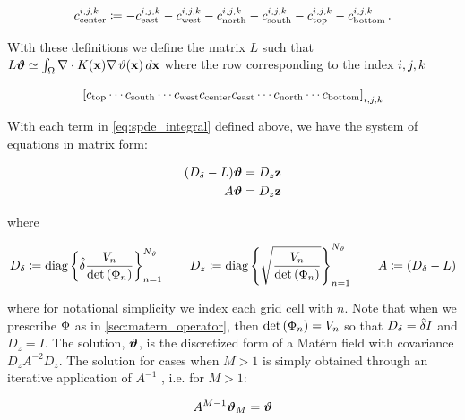 \begin{linenomath*}\begin{equation*}
    c_\text{center}^{i,j,k} \coloneqq
        - c_\text{east}^{i,j,k} - c_\text{west}^{i,j,k}
        - c_\text{north}^{i,j,k} - c_\text{south}^{i,j,k}
        - c_\text{top}^{i,j,k} - c_\text{bottom}^{i,j,k} \, .
\end{equation*}\end{linenomath*}
With these definitions we define the matrix $L$ such that
$L \bm{\vartheta} \simeq \int_{\Omega} \nabla\cdot K(\mathbf{x})\nabla \, \vartheta(\mathbf{x})\,d\mathbf{x}$
where the row corresponding to the index ${i,j,k}$
\begin{linenomath*}\begin{equation*}
    \left[ c_\text{top} \cdots c_\text{south} \cdots
           c_\text{west} c_\text{center} c_\text{east} \cdots
           c_\text{north} \cdots c_\text{bottom}
       \right]_{{i,j,k}}
\end{equation*}\end{linenomath*}

With each term in \cref{eq:spde_integral} defined above, we have the system of
equations in matrix form:
\begin{linenomath*}\begin{equation}
    \begin{aligned}
        (D_\delta - L) \bm{\vartheta} &= D_z\mathbf{z}\\
        A\bm{\vartheta} &= D_z\mathbf{z}
    \end{aligned}
    \label{eq:fv_spde}
\end{equation}\end{linenomath*}
where
\begin{linenomath*}\begin{equation*}
    \begin{aligned}
        D_\delta \coloneqq \text{diag}
            \left\{
                \hat{\delta}\dfrac{V_n}{\text{det}\left(\Phi_{n}\right)}
            \right\}_{n=1}^{N_{\vartheta}}
            \qquad
        D_z \coloneqq \text{diag}
            \left\{
                \sqrt{\dfrac{V_n}{\text{det}\left(\Phi_{n}\right)}}
            \right\}_{n=1}^{N_{\vartheta}}
            \qquad
        A \coloneqq \left(D_\delta - L\right)
    \end{aligned}
\end{equation*}\end{linenomath*}
where for notational simplicity we index each grid cell with $n$.
Note that when we prescribe $\Phi$ as in \cref{sec:matern_operator},
then $\text{det}\left(\Phi_{n}\right) = V_n$ so that $D_\delta = \hat{\delta} I$ and $D_z = I$.
The solution, $\bm{\vartheta}$, is the discretized form of a Mat\'ern field with
covariance $D_z A^{-2} D_z$.
The solution for cases when $M>1$ is simply obtained through an iterative
application of $A^{-1}$ \citep[see also Theorem 4 in Appendix C.4
of][]{RSSB:RSSB777}, i.e. for $M>1$:
\begin{linenomath*}\begin{equation*}
    A^{M-1} \bm{\vartheta}_M = \bm{\vartheta}
\end{equation*}\end{linenomath*}



